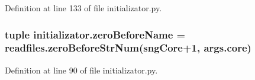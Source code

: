 Definition at line 133 of file initializator.\-py.

\hypertarget{a00104_a475e51ace78f2490aa4206915d0e3ae6}{
\subsubsection[{zero\-Before\-Name}]{\setlength{\rightskip}{0pt plus 5cm}tuple initializator.\-zero\-Before\-Name = readfiles.\-zero\-Before\-Str\-Num(sng\-Core+1, args.\-core)}}\label{a00104_a475e51ace78f2490aa4206915d0e3ae6}


Definition at line 90 of file initializator.\-py.

